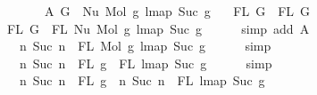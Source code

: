 \begin{isabellebody}
\ \ \ \ \ \ \ A{}{\isacharcolon}{\kern0pt}\ {\isachardoublequoteopen}G{}\ {\isacharequal}{\kern0pt}\ Nu\ {\isacharparenleft}{\kern0pt}Mol\ g{}\ {\isacharparenleft}{\kern0pt}lmap\ Suc\ g{}{\isacharparenright}{\kern0pt}{\isacharparenright}{\kern0pt}{\isachardoublequoteclose}\isanewline
\ \ \ {\isachardoublequoteopen}FL\ G{}\ {\isacharequal}{\kern0pt}\ FL\ G{}{\isachardoublequoteclose}\isanewline
%
\isadelimproof
%
\endisadelimproof
%
\isatagproof
{}\isamarkupfalse%
\ {\isacharminus}{\kern0pt}\isanewline
\ \ \isamarkupfalse%
\ {\isachardoublequoteopen}FL\ G{}\ {\isacharequal}{\kern0pt}\ FL\ {\isacharparenleft}{\kern0pt}Nu\ {\isacharparenleft}{\kern0pt}Mol\ g{}\ {\isacharparenleft}{\kern0pt}lmap\ Suc\ g{}{\isacharparenright}{\kern0pt}{\isacharparenright}{\kern0pt}{\isacharparenright}{\kern0pt}{\isachardoublequoteclose}\isanewline
\ \ \ \ \isamarkupfalse%
\ {\isacharparenleft}{\kern0pt}simp\ add{\isacharcolon}{\kern0pt}\ A{}{\isacharparenright}{\kern0pt}\isanewline
\ \ \isamarkupfalse%
\ \isamarkupfalse%
\ {\isachardoublequoteopen}{\isachardot}{\kern0pt}{\isachardot}{\kern0pt}{\isachardot}{\kern0pt}\ {\isacharequal}{\kern0pt}\ {\isacharbraceleft}{\kern0pt}n{\isachardot}{\kern0pt}\ Suc\ n\ {\isasymin}\ FL\ {\isacharparenleft}{\kern0pt}Mol\ g{}\ {\isacharparenleft}{\kern0pt}lmap\ Suc\ g{}{\isacharparenright}{\kern0pt}{\isacharparenright}{\kern0pt}{\isacharbraceright}{\kern0pt}{\isachardoublequoteclose}\isanewline
\ \ \ \ \isamarkupfalse%
\ simp\isanewline
\ \ \isamarkupfalse%
\ \isamarkupfalse%
\ {\isachardoublequoteopen}{\isachardot}{\kern0pt}{\isachardot}{\kern0pt}{\isachardot}{\kern0pt}\ {\isacharequal}{\kern0pt}\ {\isacharbraceleft}{\kern0pt}n{\isachardot}{\kern0pt}\ Suc\ n\ {\isasymin}\ {\isacharparenleft}{\kern0pt}FL\ g{}\ {\isasymunion}\ FL\ {\isacharparenleft}{\kern0pt}lmap\ Suc\ g{}{\isacharparenright}{\kern0pt}{\isacharparenright}{\kern0pt}{\isacharbraceright}{\kern0pt}{\isachardoublequoteclose}\isanewline
\ \ \ \ \isamarkupfalse%
\ simp\isanewline
\ \ \isamarkupfalse%
\ \isamarkupfalse%
\ {\isachardoublequoteopen}{\isachardot}{\kern0pt}{\isachardot}{\kern0pt}{\isachardot}{\kern0pt}\ {\isacharequal}{\kern0pt}\ {\isacharbraceleft}{\kern0pt}n{\isachardot}{\kern0pt}\ Suc\ n\ {\isasymin}\ FL\ g{}{\isacharbraceright}{\kern0pt}\ {\isasymunion}\ {\isacharbraceleft}{\kern0pt}n{\isachardot}{\kern0pt}\ Suc\ n\ {\isasymin}\ FL\ {\isacharparenleft}{\kern0pt}lmap\ Suc\ g{}{\isacharparenright}{\kern0pt}{\isacharbraceright}{\kern0pt}{\isachardoublequoteclose}\isanewline

\end{isabellebody}
